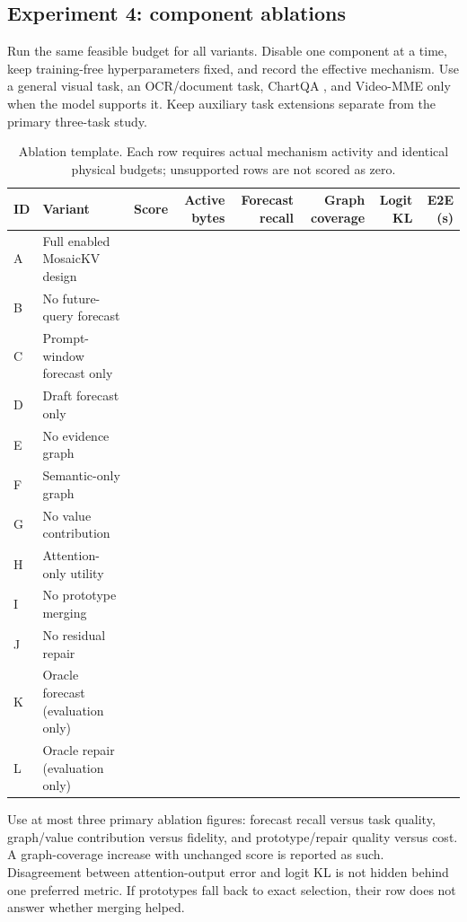 \subsection{Experiment 4: component ablations}
Run the same feasible budget for all variants. Disable one component at a time,
keep training-free hyperparameters fixed, and record the effective mechanism.
Use a general visual task, an OCR/document task, ChartQA
\citep{masry2022chartqa}, and Video-MME \citep{fu2024videomme}
only when the model supports it. Keep auxiliary task extensions separate from
the primary three-task study.

\begin{table}[t]
\caption{Ablation template. Each row requires actual mechanism activity and
identical physical budgets; unsupported rows are not scored as zero.}
\small\begin{tabular}{llrrrrrr}\toprule
ID & Variant & Score & Active bytes & Forecast recall & Graph coverage & Logit KL & E2E (s)\\\midrule
A & Full enabled MosaicKV design & & & & & & \\
B & No future-query forecast & & & & & & \\
C & Prompt-window forecast only & & & & & & \\
D & Draft forecast only & & & & & & \\
E & No evidence graph & & & & & & \\
F & Semantic-only graph & & & & & & \\
G & No value contribution & & & & & & \\
H & Attention-only utility & & & & & & \\
I & No prototype merging & & & & & & \\
J & No residual repair & & & & & & \\
K & Oracle forecast (evaluation only) & & & & & & \\
L & Oracle repair (evaluation only) & & & & & & \\
\bottomrule\end{tabular}
\end{table}

Use at most three primary ablation figures: forecast recall versus task quality,
graph/value contribution versus fidelity, and prototype/repair quality versus
cost. A graph-coverage increase with unchanged score is reported as such.
Disagreement between attention-output error and logit KL is not hidden behind
one preferred metric. If prototypes fall back to exact selection, their row
does not answer whether merging helped.

